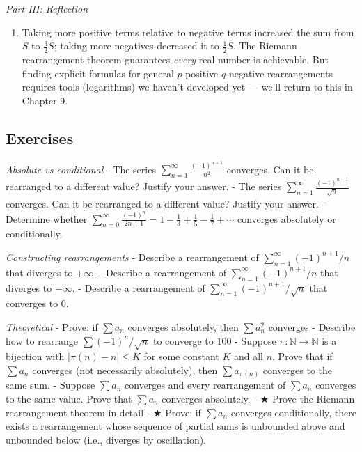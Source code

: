 \documentclass[
  10pt,
  letterpaper,
]{scrbook}
\providecommand{\tightlist}{%
  \setlength{\itemsep}{0pt}\setlength{\parskip}{0pt}}
\begin{document}
\emph{Part III: Reflection}

\begin{enumerate}
\def\labelenumi{(\alph{enumi})}
\setcounter{enumi}{6}
\tightlist
\item
  Taking more positive terms relative to negative terms increased the
  sum from \(S\) to \(\frac{3}{2}S\); taking more negatives decreased it
  to \(\frac{1}{2}S\). The Riemann rearrangement theorem guarantees
  \emph{every} real number is achievable. But finding explicit formulas
  for general \(p\)-positive-\(q\)-negative rearrangements requires
  tools (logarithms) we haven't developed yet --- we'll return to this
  in Chapter 9.
\end{enumerate}

\subsection{Exercises}\label{exercises-20}

\emph{Absolute vs conditional} - The series
\(\sum_{n=1}^{\infty} \frac{(-1)^{n+1}}{n^2}\) converges. Can it be
rearranged to a different value? Justify your answer. - The series
\(\sum_{n=1}^{\infty} \frac{(-1)^{n+1}}{\sqrt{n}}\) converges. Can it be
rearranged to a different value? Justify your answer. - Determine
whether
\(\sum_{n=0}^{\infty} \frac{(-1)^n}{2n+1} = 1 - \frac{1}{3} + \frac{1}{5} - \frac{1}{7} + \cdots\)
converges absolutely or conditionally.

\emph{Constructing rearrangements} - Describe a rearrangement of
\(\sum_{n=1}^{\infty} (-1)^{n+1}/n\) that diverges to \(+\infty\). -
Describe a rearrangement of \(\sum_{n=1}^{\infty} (-1)^{n+1}/n\) that
diverges to \(-\infty\). - Describe a rearrangement of
\(\sum_{n=1}^{\infty} (-1)^{n+1}/\sqrt{n}\) that converges to \(0\).

\emph{Theoretical} - Prove: if \(\sum a_n\) converges absolutely, then
\(\sum a_n^2\) converges - Describe how to rearrange
\(\sum (-1)^n/\sqrt{n}\) to converge to \(100\) - Suppose
\(\pi: \mathbb{N} \to \mathbb{N}\) is a bijection with
\(|\pi(n) - n| \leq K\) for some constant \(K\) and all \(n\). Prove
that if \(\sum a_n\) converges (not necessarily absolutely), then
\(\sum a_{\pi(n)}\) converges to the same sum. - Suppose \(\sum a_n\)
converges and every rearrangement of \(\sum a_n\) converges to the same
value. Prove that \(\sum a_n\) converges absolutely. - ★ Prove the
Riemann rearrangement theorem in detail - ★ Prove: if \(\sum a_n\)
converges conditionally, there exists a rearrangement whose sequence of
partial sums is unbounded above and unbounded below (i.e., diverges by
oscillation).
\end{document}
